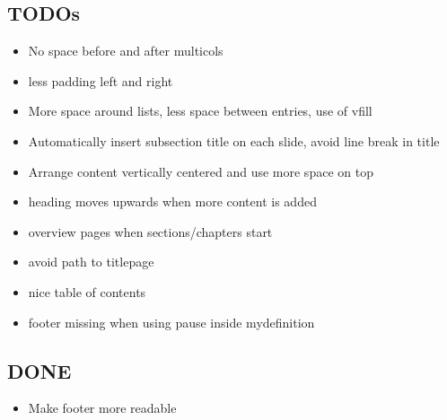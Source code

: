 \subsection{TODOs}
\begin{frame}{\insertsubsection}
	\begin{itemize}
		\item No space before and after multicols
		\item less padding left and right
		\item More space around lists, less space between entries, use of vfill
		\item Automatically insert subsection title on each slide, avoid line break in title
		\item Arrange content vertically centered and use more space on top
		\item heading moves upwards when more content is added
		\item overview pages when sections/chapters start
		\item avoid path to titlepage
		\item nice table of contents
		\item footer missing when using pause inside mydefinition
	\end{itemize}
\end{frame}

\subsection{DONE}
\begin{frame}{\insertsubsection}
	\begin{itemize}
		\item Make footer more readable
	\end{itemize}
\end{frame}


